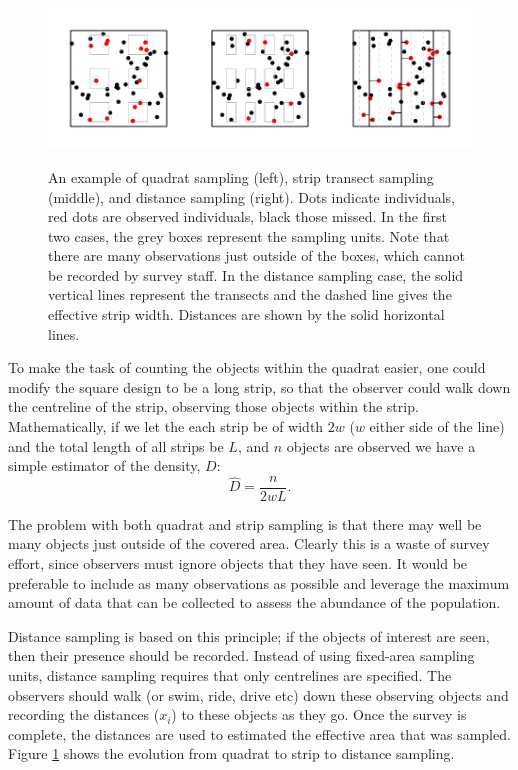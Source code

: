\begin{figure}
\centering
\includegraphics{intro/figs/quadrat-to-ds.pdf}\\
\caption{An example of quadrat sampling (left), strip transect sampling (middle), and distance sampling (right). Dots indicate individuals, red dots are observed individuals, black those missed. In the first two cases, the grey boxes represent the sampling units. Note that there are many observations just outside of the boxes, which cannot be recorded by survey staff. In the distance sampling case, the solid vertical lines represent the transects and the dashed line gives the effective strip width. Distances are shown by the solid horizontal lines.}
\label{quad-to-ds}
\end{figure}

To make the task of counting the objects within the quadrat easier, one could modify the square design to be a long strip, so that the observer could walk down the centreline of the strip, observing those objects within the strip. Mathematically, if we let the each strip be of width $2w$ ($w$ either side of the line) and the total length of all strips be $L$, and $n$ objects are observed we have a simple estimator of the density, $D$:
\begin{equation}
\hat{D}=\frac{n}{2wL}.
\label{ds-simpleD}
\end{equation}

The problem with both quadrat and strip sampling is that there may well be many objects just outside of the covered area. Clearly this is a waste of survey effort, since observers must ignore objects that they have seen. It would be preferable to include as many observations as possible and leverage the maximum amount of data that can be collected to assess the abundance of the population.

Distance sampling is based on this principle; if the objects of interest are seen, then their presence should be recorded. Instead of using fixed-area sampling units, distance sampling requires that only centrelines are specified. The observers should walk (or swim, ride, drive etc) down these observing objects and recording the distances ($x_i$) to these objects as they go. Once the survey is complete, the distances are used to estimated the effective area that was sampled. Figure \ref{quad-to-ds} shows the evolution from quadrat to strip to distance sampling.

